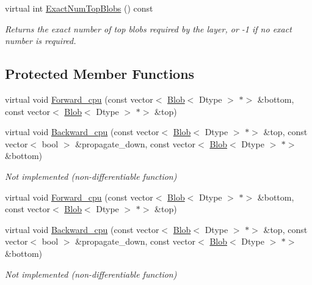 \begin{DoxyCompactItemize}
virtual int \mbox{\hyperlink{classcaffe_1_1_arg_max_layer_a45e9c6e7b572b915be8731fcb6403695}{Exact\+Num\+Top\+Blobs}} () const
\begin{DoxyCompactList}\small\item\em Returns the exact number of top blobs required by the layer, or -\/1 if no exact number is required. \end{DoxyCompactList}\end{DoxyCompactItemize}
\subsection*{Protected Member Functions}
\begin{DoxyCompactItemize}
\item 
virtual void \mbox{\hyperlink{classcaffe_1_1_arg_max_layer_a0e4cb76ff1796b71079f83335f033c44}{Forward\+\_\+cpu}} (const vector$<$ \mbox{\hyperlink{classcaffe_1_1_blob}{Blob}}$<$ Dtype $>$ $\ast$$>$ \&bottom, const vector$<$ \mbox{\hyperlink{classcaffe_1_1_blob}{Blob}}$<$ Dtype $>$ $\ast$$>$ \&top)
\item 
\mbox{\label{classcaffe_1_1_arg_max_layer_a763be1ca5815fbe1eec62ec206ae3f6e}} 
virtual void \mbox{\hyperlink{classcaffe_1_1_arg_max_layer_a763be1ca5815fbe1eec62ec206ae3f6e}{Backward\+\_\+cpu}} (const vector$<$ \mbox{\hyperlink{classcaffe_1_1_blob}{Blob}}$<$ Dtype $>$ $\ast$$>$ \&top, const vector$<$ bool $>$ \&propagate\+\_\+down, const vector$<$ \mbox{\hyperlink{classcaffe_1_1_blob}{Blob}}$<$ Dtype $>$ $\ast$$>$ \&bottom)
\begin{DoxyCompactList}\small\item\em Not implemented (non-\/differentiable function) \end{DoxyCompactList}\item 
virtual void \mbox{\hyperlink{classcaffe_1_1_arg_max_layer_a5443ad874d389b1ddbb1e363857a049f}{Forward\+\_\+cpu}} (const vector$<$ \mbox{\hyperlink{classcaffe_1_1_blob}{Blob}}$<$ Dtype $>$ $\ast$$>$ \&bottom, const vector$<$ \mbox{\hyperlink{classcaffe_1_1_blob}{Blob}}$<$ Dtype $>$ $\ast$$>$ \&top)
\item 
\mbox{\label{classcaffe_1_1_arg_max_layer_a763be1ca5815fbe1eec62ec206ae3f6e}} 
virtual void \mbox{\hyperlink{classcaffe_1_1_arg_max_layer_a763be1ca5815fbe1eec62ec206ae3f6e}{Backward\+\_\+cpu}} (const vector$<$ \mbox{\hyperlink{classcaffe_1_1_blob}{Blob}}$<$ Dtype $>$ $\ast$$>$ \&top, const vector$<$ bool $>$ \&propagate\+\_\+down, const vector$<$ \mbox{\hyperlink{classcaffe_1_1_blob}{Blob}}$<$ Dtype $>$ $\ast$$>$ \&bottom)
\begin{DoxyCompactList}\small\item\em Not implemented (non-\/differentiable function) \end{DoxyCompactList}\end{DoxyCompactItemize}
